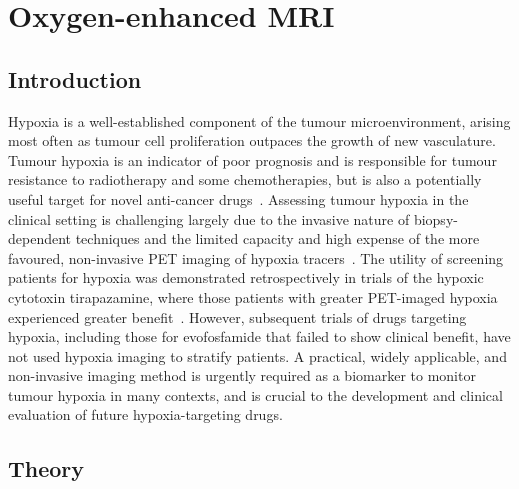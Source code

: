 
\chapter{Oxygen-enhanced MRI}
\label{ch:oemri1}

\section{Introduction}

Hypoxia is a well-established component of the tumour microenvironment, arising most often as tumour cell proliferation outpaces the growth of new vasculature.
Tumour hypoxia is an indicator of poor prognosis and is responsible for tumour resistance to radiotherapy and some chemotherapies, but is also a potentially useful target for novel anti-cancer drugs~\cite{Wilson:2011jp}.
Assessing tumour hypoxia in the clinical setting is challenging largely due to the invasive nature of biopsy-dependent techniques and the limited capacity and high expense of the more favoured, non-invasive PET imaging of hypoxia tracers~\cite{Horsman:2012kw}.
The utility of screening patients for hypoxia was demonstrated retrospectively in trials of the hypoxic cytotoxin tirapazamine, where those patients with greater PET-imaged hypoxia experienced greater benefit~\cite{Rischin:2006fz}.
However, subsequent trials of drugs targeting hypoxia, including those for evofosfamide that failed to show clinical benefit, have not used hypoxia imaging to stratify patients.
A practical, widely applicable, and non-invasive imaging method is urgently required as a biomarker to monitor tumour hypoxia in many contexts, and is crucial to the development and clinical evaluation of future hypoxia-targeting drugs.

\section{Theory}
